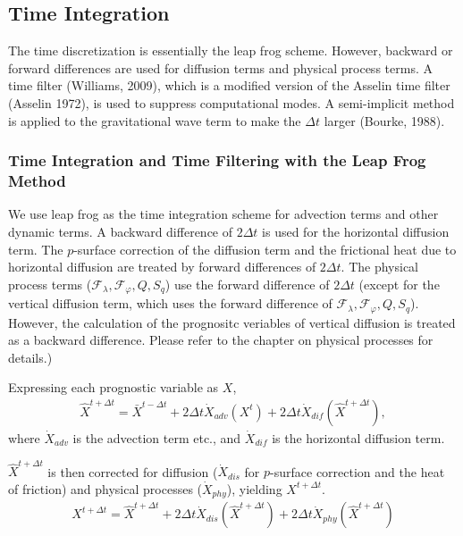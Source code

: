 \hypertarget{time-integration}{%
\subsection{Time Integration}\label{time-integration}}

The time discretization is essentially the leap frog scheme. However,
backward or forward differences are used for diffusion terms and
physical process terms.
A time filter (Williams, 2009), which is a
modified version of the Asselin time filter (Asselin 1972), is used to
suppress computational modes.
A semi-implicit method is applied to
the gravitational wave term to make the \(\Delta t\) larger (Bourke,
1988).

\hypertarget{time-integration-and-time-filtering-with-leap-frog}{%
\subsubsection{Time Integration and Time Filtering with the Leap
Frog Method}\label{time-integration-and-time-filtering-with-leap-frog}}

We use leap frog as the time integration scheme for advection terms and
other dynamic terms.
A backward difference of \(2 \Delta t\) is used for
the horizontal diffusion term.
The \(p\)-surface correction of the
diffusion term and the frictional heat due to horizontal diffusion
are treated by forward differences of
\(2 \Delta t\). The physical process terms
(\({\mathcal F}_\lambda, {\mathcal F}_\varphi, Q, S_q\)) use the
forward difference of \(2 \Delta t\) (except for the vertical diffusion
term, which uses the forward difference of
\({\mathcal F}_\lambda, {\mathcal F}_\varphi, Q, S_q\)). However, the
calculation of the prognositc veriables of vertical diffusion is treated
as a backward difference. Please refer to the chapter on physical
processes for details.)

Expressing each prognostic variable as \({X}\),
\begin{eqnarray}
  \hat{X}^{t+\Delta t}
    =  \bar{X}^{t-\Delta t}
    + 2 \Delta t
      \dot{X}_{adv}\left( {X}^{t} \right)
    + 2 \Delta t
      \dot{X}_{dif}\left( \hat{X}^{t+\Delta t} \right),
\end{eqnarray}
where \(\dot{X}_{adv}\) is the advection term etc., and
\(\dot{X}_{dif}\) is the horizontal diffusion term.

\(\hat{X}^{t+\Delta t}\) is then corrected for diffusion
(\(\dot{X}_{dis}\) for \(p\)-surface correction and the heat of
friction) and physical processes (\(\dot{X}_{phy}\)), yielding
\({X}^{t+\Delta t}\).
\begin{eqnarray}
  {X}^{t+\Delta t}
    =  \hat{X}^{t+\Delta t}
    + 2 \Delta t
      \dot{X}_{dis}\left( \hat{X}^{t+\Delta t} \right)
    + 2 \Delta t
      \dot{X}_{phy}\left( \hat{X}^{t+\Delta t} \right)
\end{eqnarray}

